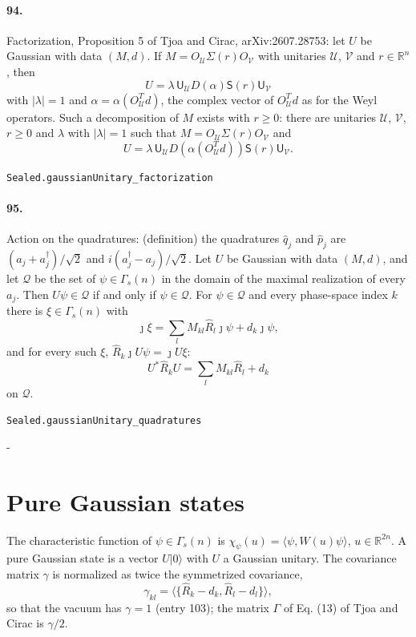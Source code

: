 \documentclass[11pt]{article}
\makeatletter
\newcommand{\keepspace}[1]{\par\penalty-100\begingroup\setlength{\dimen@}{#1}\dimen@ii\pagegoal\advance\dimen@ii-\pagetotal\ifdim\dimen@>\dimen@ii\ifdim\dimen@ii>\z@\vfil\fi\break\fi\endgroup}
\makeatother
\begin{document}
\paragraph{94.} Factorization, Proposition 5 of Tjoa and Cirac, arXiv:2607.28753: let $U$ be Gaussian with data $(M, d)$. If $M = O_{\mathcal U} \Sigma(r) O_{\mathcal V}$ with unitaries $\mathcal U$, $\mathcal V$ and $r \in \mathbb R^n$, then \[U = \lambda\, \mathsf U_{\mathcal U} D(\alpha) \mathsf S(r) \mathsf U_{\mathcal V}\] with $|\lambda| = 1$ and $\alpha = \alpha(O_{\mathcal U}^T d)$, the complex vector of $O_{\mathcal U}^T d$ as for the Weyl operators. Such a decomposition of $M$ exists with $r \ge 0$: there are unitaries $\mathcal U$, $\mathcal V$, $r \ge 0$ and $\lambda$ with $|\lambda| = 1$ such that $M = O_{\mathcal U} \Sigma(r) O_{\mathcal V}$ and \[U = \lambda\, \mathsf U_{\mathcal U} D(\alpha(O_{\mathcal U}^T d)) \mathsf S(r) \mathsf U_{\mathcal V}.\]\par{\footnotesize\texttt{Sealed.gaussianUnitary\_factorization}}

\paragraph{95.} Action on the quadratures: (definition) the quadratures $\hat q_j$ and $\hat p_j$ are $(a_j + a_j^\dagger)/\sqrt2$ and $i(a_j^\dagger - a_j)/\sqrt2$. Let $U$ be Gaussian with data $(M, d)$, and let $\mathcal Q$ be the set of $\psi \in \Gamma_s(n)$ in the domain of the maximal realization of every $a_j$. Then $U\psi \in \mathcal Q$ if and only if $\psi \in \mathcal Q$. For $\psi \in \mathcal Q$ and every phase-space index $k$ there is $\xi \in \Gamma_s(n)$ with \[\jmath\xi = \sum_l M_{kl} \hat R_l \jmath\psi + d_k \jmath\psi,\] and for every such $\xi$, $\hat R_k \jmath U\psi = \jmath U\xi$: \[U^* \hat R_k U = \sum_l M_{kl} \hat R_l + d_k\] on $\mathcal Q$.\par{\footnotesize\texttt{Sealed.gaussianUnitary\_quadratures}}

\keepspace{14\baselineskip}\section*{Pure Gaussian states}
The characteristic function of $\psi \in \Gamma_s(n)$ is $\chi_\psi(u) = \langle \psi, W(u)\psi\rangle$, $u \in \mathbb R^{2n}$. A pure Gaussian state is a vector $U|0\rangle$ with $U$ a Gaussian unitary. The covariance matrix $\gamma$ is normalized as twice the symmetrized covariance, \[\gamma_{kl} = \langle \{\hat R_k - d_k, \hat R_l - d_l\}\rangle,\] so that the vacuum has $\gamma = 1$ (entry 103); the matrix $\Gamma$ of Eq. (13) of Tjoa and Cirac is $\gamma/2$.
\end{document}

